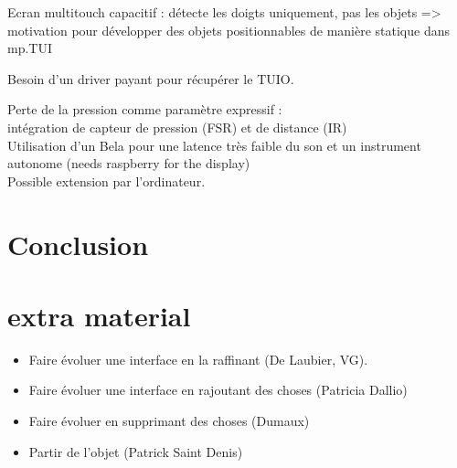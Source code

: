 Ecran multitouch capacitif : détecte les doigts uniquement, pas les objets => motivation pour développer des objets positionnables de manière statique dans mp.TUI

Besoin d'un driver payant pour récupérer le TUIO.

Perte de la pression comme paramètre expressif :\\
intégration de capteur de pression (FSR) et de distance (IR)\\
Utilisation d'un Bela pour une latence très faible du son et un instrument autonome (needs raspberry for the display)\\
Possible extension par l'ordinateur.


\section{Conclusion}
\label{sec:interfaces:conclusion}


\section*{extra material}




 \cite{bin_hands_2017}

\vspace{-1em}
\begin{itemize}[noitemsep]
\item Faire évoluer une interface en la raffinant (De Laubier, VG).
\item Faire évoluer une interface en rajoutant des choses (Patricia Dallio)
\item Faire évoluer en supprimant des choses (Dumaux)
\item Partir de l'objet (Patrick Saint Denis)
\end{itemize}

